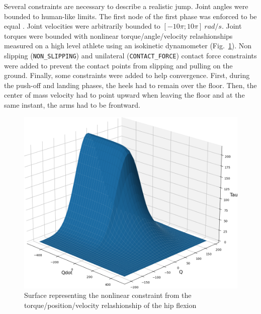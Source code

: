 Several constraints are necessary to describe a realistic jump.
Joint angles were bounded to human-like limits.
The first node of the first phase was enforced to be equal . 
Joint velocities were arbitrarily bounded to $[-10 \pi; 10 \pi]~rad/s$.
Joint torques were bounded with nonlinear torque/angle/velocity relashionships measured on a high level athlete using an isokinetic dynamometer (Fig.~\ref{fig:graph_force_vitesse_longueur}). 
Non slipping (\texttt{NON\_SLIPPING}) and unilateral (\texttt{CONTACT\_FORCE}) contact force constraints were added to prevent the contact points from slipping and pulling on the ground.
Finally, some constraints were added to help convergence.
First, during the push-off and landing phases, the heels had to remain over the floor.
Then, the center of mass velocity had to point upward when leaving the floor and at the same instant, the arms had to be frontward. 

\begin{figure}[h!]
\includegraphics[width=\columnwidth]{figures/torque_angle_velocity_hip_flexion}
\caption{Surface representing the nonlinear constraint from the torque/position/velocity relashionship of the hip flexion} 
\label{fig:graph_force_vitesse_longueur}
\end{figure}

